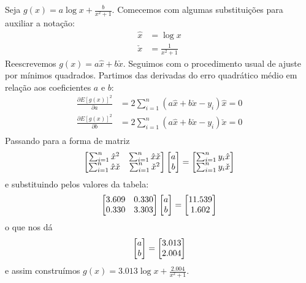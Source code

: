 \documentclass{homework}
\begin{document}
	Seja $g(x) = a \log x + \frac{b}{x^2 + 1}$. Comecemos com algumas substituições para auxiliar a notação:
		\begin{align*}
			\hat{x} & = \log x\\
			\check{x} &= \frac{1}{x^2 + 1}
		\end{align*}
	Reescrevemos $g(x) = a \hat{x} + b \check{x}$. Seguimos com o procedimento usual de ajuste por mínimos quadrados. Partimos das derivadas do erro quadrático médio em relação aos coeficientes $a$ e $b$:
		\begin{align*}
		\frac{\partial E[g(x)]^2}{\partial a} &= 2 \sum_{i = 1}^{n} (a \hat{x} + b \check{x} - y_i) \hat{x} = 0\\
		\frac{\partial E[g(x)]^2}{\partial b} &= 2 \sum_{i = 1}^{n} (a \hat{x} + b \check{x} - y_i) \check{x} = 0\\
		\end{align*}%
	Passando para a forma de matriz
		$$ \left[\begin{array}{@{}cc@{}} %
		\sum_{i = 1}^{n} \hat{x}^2 & \sum_{i = 1}^{n} \hat{x} \check{x} \\
		\sum_{i = 1}^{n} \hat{x} \check{x} & \sum_{i = 1}^{n} \check{x}^2 \\
		\end{array}\right]%
		\left[\begin{array}{@{}c@{}} %
		a\\
		b
		\end{array}\right]
		=		
		\left[\begin{array}{@{}c@{}} %
		\sum_{i = 1}^{n} y_i \hat{x} \\
		\sum_{i = 1}^{n} y_i \check{x}
		\end{array}\right]
		$$	
	e substituindo pelos valores da tabela:
		$$ \left[\begin{array}{@{}cc@{}} %
		3.609 & 0.330 \\
		0.330 & 3.303 \\
		\end{array}\right]%
		\left[\begin{array}{@{}c@{}} %
		a\\
		b
		\end{array}\right]
		=		
		\left[\begin{array}{@{}c@{}} %
		11.539 \\
		1.602
		\end{array}\right]
		$$
	o que nos dá
		$$\left[\begin{array}{@{}c@{}} %
		a\\
		b
		\end{array}\right]
		=		
		\left[\begin{array}{@{}c@{}} %
		3.013 \\
		2.004
		\end{array}\right]
		$$
	e assim construímos $g(x) = 3.013 \log x + \frac{2.004}{x^2 + 1}$.
	
\end{document}

